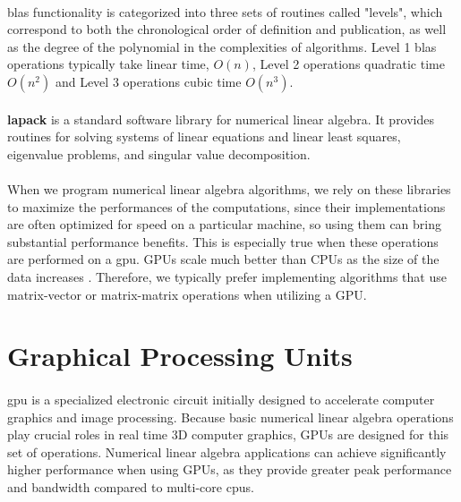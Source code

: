 \paragraph*{}
\acrshort{blas} functionality is categorized into three sets of routines called "levels", which correspond to both the chronological order of definition and publication, as well as the degree of the polynomial in the complexities of algorithms. Level 1 \acrshort{blas} operations typically take linear time, $O(n)$, Level 2 operations quadratic time $O(n^2)$ and Level 3 operations cubic time $O(n^3)$.

\paragraph*{}
\textbf{\acrfull{lapack}} \cite{lapack} is a standard software library for numerical linear algebra. It provides routines for solving systems of linear equations and linear least squares, eigenvalue problems, and singular value decomposition.

\paragraph*{}
When we program numerical linear algebra algorithms, we rely on these libraries to maximize the performances of the computations, since their implementations are often optimized for speed on a particular machine, so using them can bring substantial performance benefits. This is especially true when these operations are performed on a \acrshort{gpu}. GPUs scale much better than CPUs as the size of the data increases \cite{CPUvsGPU2019}. Therefore, we typically prefer implementing algorithms that use matrix-vector or matrix-matrix operations when utilizing a GPU.

\section{Graphical Processing Units}
\paragraph*{}
\acrfull{gpu} is a specialized electronic circuit initially designed to accelerate computer graphics and image processing. Because basic numerical linear algebra operations play crucial roles in real time 3D computer graphics, GPUs are designed for this set of operations. Numerical linear algebra applications can achieve significantly higher performance when using GPUs, as they provide greater peak performance and bandwidth compared to multi-core \acrshort{cpu}s.

